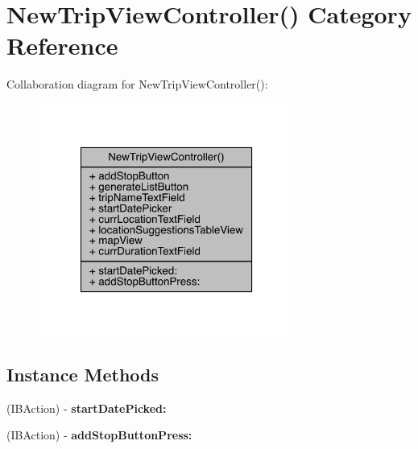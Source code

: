 \hypertarget{category_new_trip_view_controller_07_08}{\section{New\-Trip\-View\-Controller() Category Reference}
\label{category_new_trip_view_controller_07_08}
}


Collaboration diagram for New\-Trip\-View\-Controller()\-:\nopagebreak
\begin{figure}[H]
\begin{center}
\leavevmode
\includegraphics[width=238pt]{category_new_trip_view_controller_07_08__coll__graph}
\end{center}
\end{figure}
\subsection*{Instance Methods}
\begin{DoxyCompactItemize}
\item 
\hypertarget{category_new_trip_view_controller_07_08_a13a1e787f7bba2412b8254a2c5552863}{(I\-B\-Action) -\/ {\bfseries start\-Date\-Picked\-:}}\label{category_new_trip_view_controller_07_08_a13a1e787f7bba2412b8254a2c5552863}

\item 
\hypertarget{category_new_trip_view_controller_07_08_ad2bc2e48e85627ef5d02f21569694c15}{(I\-B\-Action) -\/ {\bfseries add\-Stop\-Button\-Press\-:}}\label{category_new_trip_view_controller_07_08_ad2bc2e48e85627ef5d02f21569694c15}

\end{DoxyCompactItemize}
